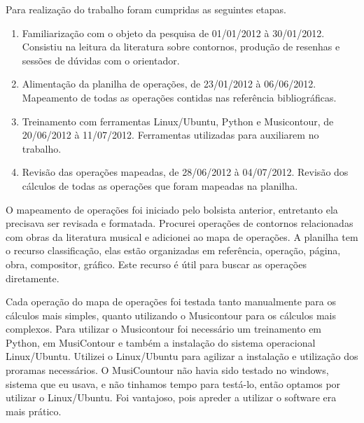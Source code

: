 \documentclass[11pt]{article}
\begin{document}
Para realização do trabalho foram cumpridas as seguintes etapas.

\begin{enumerate}
\item Familiarização com o objeto da pesquisa de 01/01/2012 à 30/01/2012.
Consistiu na leitura da literatura sobre contornos, produção de resenhas
e sessões de dúvidas com o orientador.
\item Alimentação da planilha de operações, de 23/01/2012 à 06/06/2012.
Mapeamento de todas as operações contidas nas referência
bibliográficas.
\item Treinamento com ferramentas Linux/Ubuntu, Python e Musicontour, de 20/06/2012 à 11/07/2012.
Ferramentas utilizadas para auxiliarem no trabalho.
\item Revisão das operações mapeadas, de 28/06/2012 à 04/07/2012.
Revisão dos cálculos de todas as operações que foram mapeadas na planilha.
\end{enumerate}

O mapeamento de operações foi iniciado pelo bolsista anterior,
entretanto ela precisava ser revisada e formatada.  Procurei operações
de contornos relacionadas com obras da literatura musical e adicionei
ao mapa de operações.
A planilha tem o recurso classificação, elas estão organizadas em
referência, operação, página, obra, compositor, gráfico.  Este recurso
é útil para buscar as operações diretamente.

Cada operação do mapa de operações foi testada tanto manualmente para os
cálculos mais simples, quanto utilizando o Musicontour para os cálculos mais
complexos. Para utilizar o Musicontour foi necessário um treinamento em Python,
em MusiContour e também a instalação do sistema operacional
Linux/Ubuntu.
Utilizei o Linux/Ubuntu para
agilizar a instalação e utilização dos proramas necessários. O MusiCountour não
havia sido testado no windows, sistema que eu usava, e não
tinhamos tempo para testá-lo, então optamos por utilizar o
Linux/Ubuntu.
Foi vantajoso, pois apreder a utilizar o software
era mais prático.
\end{document}
